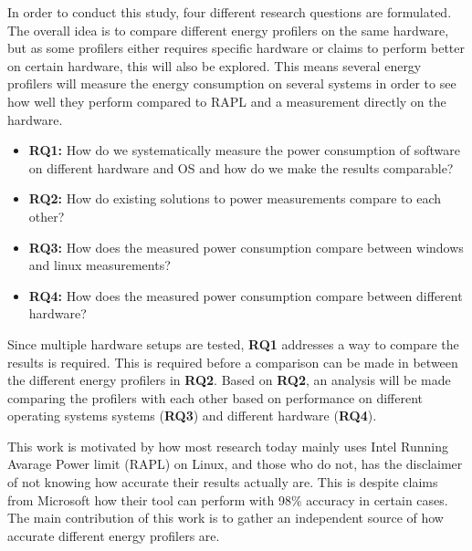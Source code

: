 In order to conduct this study, four different research questions are formulated. The overall idea is to compare different energy profilers on the same hardware, but as some profilers either requires specific hardware or claims to perform better on certain hardware, this will also be explored. This means several energy profilers will measure the energy consumption on several systems in order to see how well they perform compared to RAPL and a measurement directly on the hardware.


\begin{itemize}
    \item \textbf{RQ1:} How do we systematically measure the power consumption of software on different hardware and OS and how do we make the results comparable?
    \item \textbf{RQ2:} How do existing solutions to power measurements compare to each other?
    \item \textbf{RQ3:} How does the measured power consumption compare between windows and linux measurements?
    \item \textbf{RQ4:} How does the measured power consumption compare between different hardware?
\end{itemize}

Since multiple hardware setups are tested, \textbf{RQ1} addresses a way to compare the results is required. This is required before a comparison can be made in between the different energy profilers in \textbf{RQ2}. Based on \textbf{RQ2}, an analysis will be made comparing the profilers with each other based on performance on different operating systems systems (\textbf{RQ3}) and different hardware (\textbf{RQ4}).

This work is motivated by how most research today mainly uses Intel Running Avarage Power limit (RAPL) on Linux\cite[]{Rasmussen2021,Pereira2017,Theilmann2022,Lindholt2022}, and those who do not, has the disclaimer of not knowing how accurate their results actually are\cite[]{Bruce2015ReducingEC, Ozturk2019, Unlu2021}. This is despite claims from Microsoft how their tool can perform with 98\% accuracy in certain cases\cite[]{E3WinHec}. The main contribution of this work is to gather an independent source of how accurate different energy profilers are.





